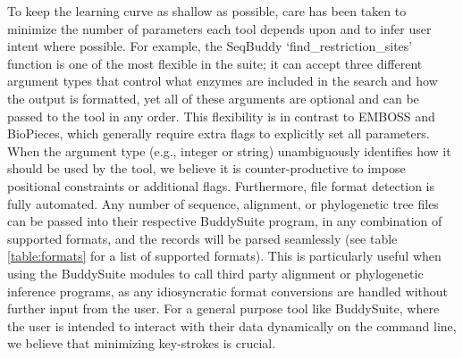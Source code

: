 \documentclass[nogrid]{MBE_article}%
\begin{document}
To keep the learning curve as shallow as possible, care has been taken to minimize the number of parameters each tool depends upon and to infer user intent where possible. For example, the SeqBuddy `find\_restriction\_sites' function is one of the most flexible in the suite; it can accept three different argument types that control what enzymes are included in the search and how the output is formatted, yet all of these arguments are optional and can be passed to the tool in any order. This flexibility is in contrast to EMBOSS and BioPieces, which generally require extra flags to explicitly set all parameters. When the argument type (e.g., integer or string) unambiguously identifies how it should be used by the tool, we believe it is counter-productive to impose positional constraints or additional flags. Furthermore, file format detection is fully automated. Any number of sequence, alignment, or phylogenetic tree files can be passed into their respective BuddySuite program, in any combination of supported formats, and the records will be parsed seamlessly (see table \ref{table:formats} for a list of supported formats). This is particularly useful when using the BuddySuite modules to call third party alignment or phylogenetic inference programs, as any idiosyncratic format conversions are handled without further input from the user. For a general purpose tool like BuddySuite, where the user is intended to interact with their data dynamically on the command line, we believe that minimizing key-strokes is crucial.
\end{document}
